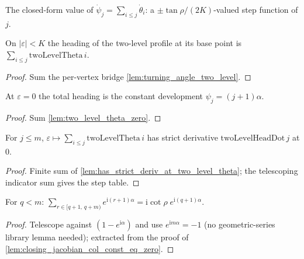 \begin{definition}
  \label{def:two_level_head_dot}
  The closed-form value of $\dot\psi_j = \sum_{i \le j}\dot\theta_i$: a
  $\pm\tan\rho/(2K)$-valued step function of $j$.
\end{definition}

\begin{lemma}
  \label{lem:heading_two_level}
  On $|\varepsilon| < K$ the heading of the two-level profile at its base
  point is $\sum_{i \le j} \mathrm{twoLevelTheta}\,i$.
\end{lemma}
\begin{proof}

\leanok
  Sum the per-vertex bridge \cref{lem:turning_angle_two_level}.
\end{proof}

\begin{lemma}\leanok
[heading at $\varepsilon = 0$]
  \label{lem:sum_two_level_theta_zero}
  At $\varepsilon = 0$ the total heading is the constant development
  $\psi_j = (j+1)\alpha$.
\end{lemma}
\begin{proof}

\leanok
  Sum \cref{lem:two_level_theta_zero}.
\end{proof}

\begin{lemma}
  \label{lem:has_strict_deriv_at_two_level_head}
  For $j \le m$, $\varepsilon \mapsto \sum_{i \le j}\mathrm{twoLevelTheta}\,i$
  has strict derivative $\mathrm{twoLevelHeadDot}\,j$ at $0$.
\end{lemma}
\begin{proof}

\leanok
  Finite sum of \cref{lem:has_strict_deriv_at_two_level_theta}; the telescoping
  indicator sum gives the step table.
\end{proof}

\begin{lemma}
  \label{lem:sum_exp_ico_eq}
  For $q < m$:
  $\sum_{r \in [q+1,\,q+m)} e^{\mathrm{i}(r+1)\alpha}
   = \mathrm{i}\cot\rho\; e^{\mathrm{i}(q+1)\alpha}$.
\end{lemma}
\begin{proof}

\leanok
  Telescope against $(1 - e^{\mathrm{i}\alpha})$ and use
  $e^{\mathrm{i}m\alpha} = -1$ (no geometric-series library lemma needed);
  extracted from the proof of \cref{lem:closing_jacobian_col_const_eq_zero}.
\end{proof}

